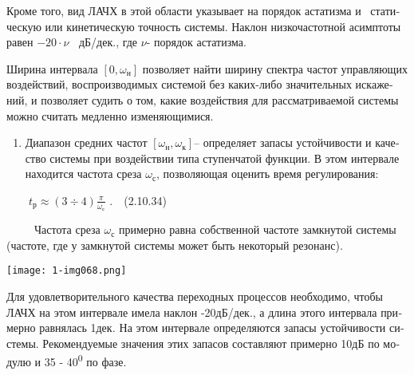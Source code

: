 \documentclass[a4paper]{article}
\newcounter{saveenum}
\newcommand\liststyleWWviiiNumlxx{%
\renewcommand\theenumi{\arabic{enumi}}
\renewcommand\theenumii{\arabic{enumii}}
\renewcommand\theenumiii{\arabic{enumiii}}
\renewcommand\theenumiv{\arabic{enumiv}}
\renewcommand\labelenumi{\theenumi).}
\renewcommand\labelenumii{\theenumii.}
\renewcommand\labelenumiii{\theenumiii.}
\renewcommand\labelenumiv{\theenumiv.}
}
\begin{document}
{\begin{russian}\sffamily
Кроме того, вид ЛАЧХ в этой области указывает на порядок астатизма и \ статическую или кинетическую точность системы.
Наклон низкочастотной асимптоты равен  $-20\cdot ν\;\;$ дБ/дек., где  $ν$- порядок астатизма.
\end{russian}}

{\begin{russian}\sffamily
Ширина интервала  $\left[0,ω_н\right]$ позволяет найти ширину спектра частот управляющих воздействий, воспроизводимых
системой без каких-либо значительных искажений, и позволяет судить о том, какие воздействия для рассматриваемой системы
можно считать медленно изменяющимися.
\end{russian}}


\bigskip

\liststyleWWviiiNumlxx
\setcounter{saveenum}{\value{enumi}}
\begin{enumerate}
\setcounter{enumi}{\value{saveenum}}
\item {\begin{russian}\sffamily
Диапазон средних частот  $\left[ω_н,ω_к\right]$– определяет запасы устойчивости и качество системы при воздействии типа
ступенчатой функции. В этом интервале находится частота среза  $ω_с$, позволяющая оценить время регулирования:
\end{russian}}
\end{enumerate}
{\begin{russian}\sffamily
\ \ \ \  $t_р\approx (3\div 4)\frac π{ω_с}$ .\ \ (2.10.34)
\end{russian}}

{\begin{russian}\sffamily
\ \ \ \ \ Частота среза  $ω_с$ примерно равна собственной частоте замкнутой системы (частоте, где у замкнутой системы
может быть некоторый резонанс).
\end{russian}}

{\centering  \texttt{[image: 1-img068.png]} \par}

\bigskip

{\begin{russian}\sffamily
Для удовлетворительного качества переходных процессов необходимо, чтобы ЛАЧХ на этом интервале имела наклон -20дБ/дек.,
а длина этого интервала примерно равнялась 1дек\textit{.} На этом интервале определяются запасы устойчивости системы.
Рекомендуемые значения этих запасов составляют примерно 10дБ по модулю и 35 - 40\textsuperscript{0} по фазе.
\end{russian}}
\end{document}
